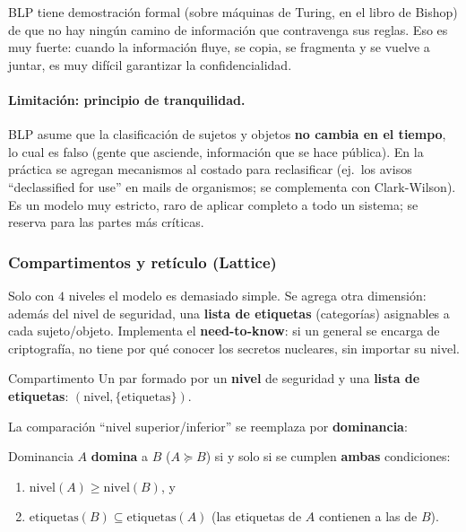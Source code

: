 \documentclass[../main.tex]{subfiles}
\begin{document}
\begin{destacado}
BLP tiene demostración formal (sobre máquinas de Turing, en el libro de Bishop) de que no hay ningún camino de información que contravenga sus reglas. Eso es muy fuerte: cuando la información fluye, se copia, se fragmenta y se vuelve a juntar, es muy difícil garantizar la confidencialidad.
\end{destacado}

\paragraph{Limitación: principio de tranquilidad.} BLP asume que la clasificación de sujetos y objetos \textbf{no cambia en el tiempo}, lo cual es falso (gente que asciende, información que se hace pública). En la práctica se agregan mecanismos al costado para reclasificar (ej.\ los avisos ``declassified for use'' en mails de organismos; se complementa con Clark-Wilson). Es un modelo muy estricto, raro de aplicar completo a todo un sistema; se reserva para las partes más críticas.

\subsubsection{Compartimentos y retículo (Lattice)}

Solo con $4$ niveles el modelo es demasiado simple. Se agrega otra dimensión: además del nivel de seguridad, una \textbf{lista de etiquetas} (categorías) asignables a cada sujeto/objeto. Implementa el \textbf{need-to-know}: si un general se encarga de criptografía, no tiene por qué conocer los secretos nucleares, sin importar su nivel.

\begin{definicion}{Compartimento}
Un par formado por un \textbf{nivel} de seguridad y una \textbf{lista de etiquetas}: $(\text{nivel}, \{\text{etiquetas}\})$.
\end{definicion}

La comparación ``nivel superior/inferior'' se reemplaza por \textbf{dominancia}:

\begin{definicion}{Dominancia}
$A$ \textbf{domina} a $B$ ($A \succeq B$) si y solo si se cumplen \textbf{ambas} condiciones:
\begin{enumerate}[nosep]
  \item $\text{nivel}(A) \geq \text{nivel}(B)$, y
  \item $\text{etiquetas}(B) \subseteq \text{etiquetas}(A)$ (las etiquetas de $A$ contienen a las de $B$).
\end{enumerate}
\end{definicion}
\end{document}
